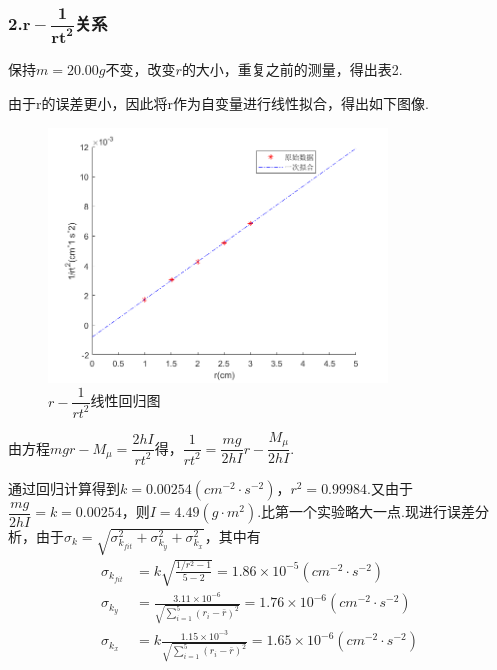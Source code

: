 \documentclass[12pt,a4paper,UTF8]{ctexart}
\begin{document}
\subsubsection*{2.$\mathbf{r-\dfrac{1}{rt^2}}$关系}
保持$m=20.00g$不变，改变$r$的大小，重复之前的测量，得出表2.
\newpage
\begin{table}[htbp]
\centering
\caption{实验二数据表}
\end{table}
\par
由于r的误差更小，因此将r作为自变量进行线性拟合，得出如下图像.
\begin{figure}[htbp]
		\centering
		\includegraphics[width=9cm]{2.png}
		\caption{$r-\dfrac{1}{rt^2}$线性回归图}
\end{figure}
\par
由方程$mgr-M_{\mu}=\dfrac{2hI}{rt^2}$得，$\dfrac{1}{rt^2}=\dfrac{mg}{2hI}r-\dfrac{M_{\mu}}{2hI}$.\par
通过回归计算得到$k=0.00254(cm^{-2}\cdot s^{-2})$，$r^2=0.99984$.又由于$\dfrac{mg}{2hI}=k=0.00254$，则$I=4.49(g\cdot m^2)$.比第一个实验略大一点.现进行误差分析，由于$\sigma_k=\sqrt{\sigma_{k_{fit}}^2+\sigma_{k_y}^2+\sigma_{k_x}^2}$，其中有
\begin{align*}
	\sigma_{k_{fit}}&=k\sqrt{\frac{1/r^2-1}{5-2}}=1.86\times10^{-5}(cm^{-2}\cdot s^{-2}) \\
	\sigma_{k_y}&=\frac{3.11\times10^{-6}}{\sqrt{\sum_{i=1}^5(r_i-\bar r)^2}}=1.76\times10^{-6}(cm^{-2}\cdot s^{-2} )\\
	\sigma_{k_x}&=k\frac{1.15\times10^{-3}}{\sqrt{\sum_{i=1}^5(r_i-\bar r)^2}}=1.65\times10^{-6}(cm^{-2}\cdot s^{-2}) \\
\end{align*}
\end{document}
